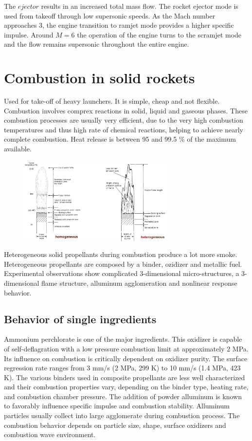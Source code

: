 \documentclass[12pt]{article}
\begin{document}
The $\textit{ejector}$ results in an increased total mass flow. The rocket ejector mode is used from takeoff through low supersonic speeds. As the Mach number approaches 3, the engine transition to ramjet mode provides a higher specific impulse. Around $M=6$ the operation of the engine turns to the scramjet mode and the flow remains supersonic throughout the entire engine.

\newpage

\section{Combustion in solid rockets}

Used for take-off of heavy launchers. It is simple, cheap and not flexible. Combustion involves comprex reactions in solid, liquid and gaseous phases. These combustion processes are usually very efficient, due to the very high combustion temperatures and thus high rate of chemical reactions, helping to achieve nearly complete combustion. Heat release is between 95 and 99.5 \% of the maximum available.

\begin{figure}[!ht]
\centering
\includegraphics[width=0.7\textwidth]{figures/homo.png}
\end{figure}

Heterogeneous solid propellants during combustion produce a lot more smoke. Heterogeneous propellants are composed by a binder, ozidizer and metallic fuel.
Experimental observations show complicated 3-dimensional micro-structures, a 3-dimensional flame structure, alluminum agglomeration and nonlinear response behavior.

\subsection{Behavior of single ingredients}

Ammonium perchlorate is one of the major ingredients. This oxidizer is capable of self-deflagration with a low pressure combustion limit at approximately 2 MPa. Its influence on combustion is critically dependent on oxidizer purity. The surface regression rate ranges from 3 mm/s (2 MPa, 299 K) to 10 mm/s (1.4 MPa, 423 K). The various binders used in composite propellants are less well characterized and their combustion properties vary, depending on the binder type, heating rate, and combustion chamber pressure. The addition of powder alluminum is known to favorably influence specific impulse and combustion stability. Alluminum particles usually collect into large agglomerate during combustion process. The combustion behavior depends on particle size, shape, surface oxidizers and combustion wave environment.
\end{document}
